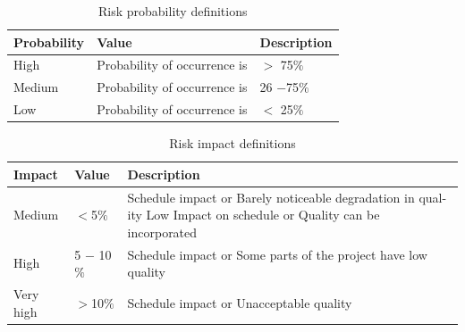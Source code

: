 \documentclass[oneside,a4paper,12pt]{book}
\begin{document}
\begin{table}[H]
 			\centering
\begin{tabular}{|| p || p|| p|| }
\hline
\hline
\multicolumn{1}{p{0.71in}}{Probability} & 
\multicolumn{1}{p{1.81in}}{Value} & 
\multicolumn{1}{p{0.75in}}{Description} \\
\hline
\hline
\multicolumn{1}{p{0.71in}}{High} & 
\multicolumn{1}{p{1.81in}}{Probability of occurrence is} & 
\multicolumn{1}{p{0.75in}}{\textit{$ > $} 75$\%$ } \\
\hline
\hline
\multicolumn{1}{p{0.71in}}{Medium} & 
\multicolumn{1}{p{1.81in}}{Probability of occurrence is} & 
\multicolumn{1}{p{0.75in}}{26 \textit{$-$}75$\%$ } \\
\hline
\hline
\multicolumn{1}{p{0.71in}}{Low} & 
\multicolumn{1}{p{1.81in}}{Probability of occurrence is} & 
\multicolumn{1}{p{0.75in}}{\textit{$<$} 25$\%$ } \\
\hline
\hline
\end{tabular}
\caption{Risk probability definitions}
 \end{table}
 \begin{center}
     \begin{table}[H]
\centering
\begin{tabular}{p{0.62in}p{0.53in}p{3.81in}}
\hline
\hline
\multicolumn{1}{p{0.62in}}{Impact} & 
\multicolumn{1}{p{0.53in}}{Value} & 
\multicolumn{1}{p{3.81in}}{Description} \\
\hline
\hline
\multicolumn{1}{p{0.62in}}{Medium} & 
\multicolumn{1}{p{0.53in}}{\textit{$<$}5$\%$ } & 
\multicolumn{1}{p{3.81in}}{Schedule impact or Barely noticeable degradation in qual- ity Low Impact on schedule or Quality can be incorporated} \\
\hline
\hline
\multicolumn{1}{p{0.62in}}{High} & 
\multicolumn{1}{p{0.53in}}{5 \textit{$-$  }10$\%$ } & 
\multicolumn{1}{p{3.81in}}{Schedule impact or Some parts of the project have low quality} \\
\hline
\hline
\multicolumn{1}{p{0.62in}}{Very high} & 
\multicolumn{1}{p{0.53in}}{\textit{$>$}10$\%$ } & 
\multicolumn{1}{p{3.81in}}{Schedule impact or Unacceptable quality} \\
\hline
\hline
\end{tabular}
\caption{Risk impact definitions}
\end{table}
\end{center}
\end{document}
